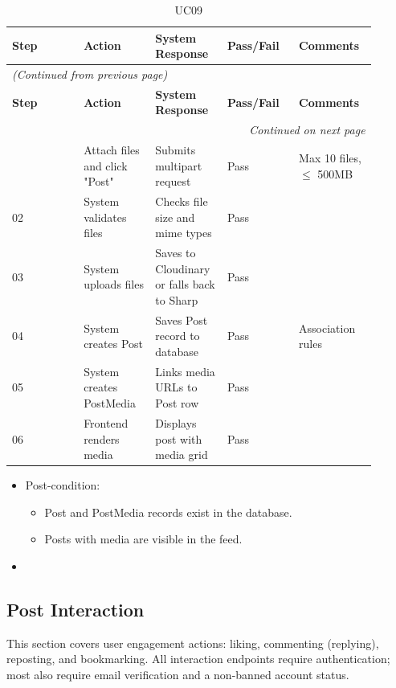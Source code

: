 \begin{longtable}{|p{0.18\linewidth}|p{0.18\linewidth}|p{0.18\linewidth}|p{0.18\linewidth}|p{0.18\linewidth}|}
\caption{UC09} \label{tab:33} \\
\hline
\textbf{Step} & \textbf{Action} & \textbf{System Response} & \textbf{Pass/Fail} & \textbf{Comments} \\
\hline
\endfirsthead
\multicolumn{5}{l}{\textit{(Continued from previous page)}} \\
\hline
\textbf{Step} & \textbf{Action} & \textbf{System Response} & \textbf{Pass/Fail} & \textbf{Comments} \\
\hline
\endhead
\hline \multicolumn{5}{r}{\textit{Continued on next page}} \\
\endfoot
\hline
\endlastfoot
01 & Attach files and click "Post" & Submits multipart request & Pass & Max 10 files, $\leq$ 500MB \\
\hline
02 & System validates files & Checks file size and mime types & Pass &  \\
\hline
03 & System uploads files & Saves to Cloudinary or falls back to Sharp & Pass &  \\
\hline
04 & System creates Post & Saves Post record to database & Pass & Association rules \\
\hline
05 & System creates PostMedia & Links media URLs to Post row & Pass &  \\
\hline
06 & Frontend renders media & Displays post with media grid & Pass &  \\
\hline
\end{longtable}

\begin{itemize}
  \item Post-condition:
\begin{itemize}
  \item Post and PostMedia records exist in the database.
  \item Posts with media are visible in the feed.
\end{itemize}
  \item 
\end{itemize}

\subsection{Post Interaction}

This section covers user engagement actions: liking, commenting (replying), reposting, and bookmarking. All interaction endpoints require authentication; most also require email verification and a non-banned account status.

